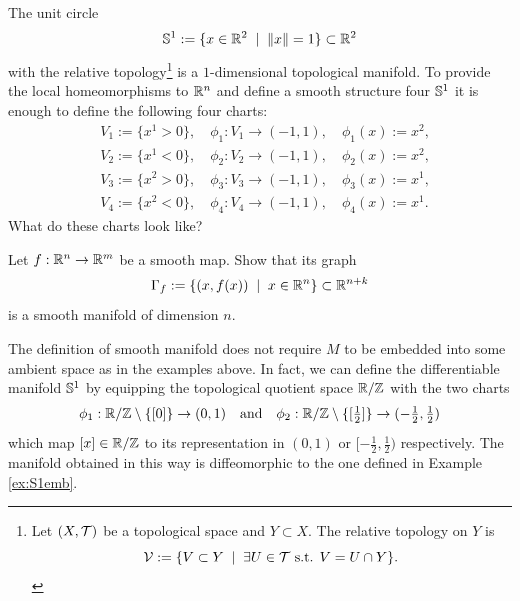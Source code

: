 \begin{example}\label{ex:S1emb}
  The unit circle
  \begin{equation}
    \mathbb{S}^1 := \{x\in\mathbb{R}^2 \;\mid\; \|x\|=1\}\subset\mathbb{R}^2
  \end{equation}
  with the relative topology\footnote{Let $(X,\mathcal{T})$ be a topological space and $Y\subset X$. The relative topology on $Y$ is \begin{equation}\mathcal{V}:=\{V\subset Y\;\mid\;\exists U\in\mathcal{T} \mbox{ s.t. } V = U \cap Y\}.\end{equation}} is a $1$-dimensional topological manifold.
  To provide the local homeomorphisms to $\mathbb{R}^n$ and define a smooth structure four $\mathbb{S}^1$ it is enough to define the following four charts:
  \begin{equation}
    \begin{aligned}
      &V_1 := \{ x^1 > 0 \},\quad \phi_1: V_1 \to (-1, 1), \quad \phi_1(x) := x^2,\\
      &V_2 := \{ x^1 < 0 \},\quad \phi_2: V_2 \to (-1, 1), \quad \phi_2(x) := x^2,\\
      &V_3 := \{ x^2 > 0 \},\quad \phi_3: V_3 \to (-1, 1), \quad \phi_3(x) := x^1,\\
      &V_4 := \{ x^2 < 0 \},\quad \phi_4: V_4 \to (-1, 1), \quad \phi_4(x) := x^1.
    \end{aligned}
  \end{equation}
  What do these charts look like?
\end{example}

\begin{exercise}
  Let $f: \mathbb{R}^n \to \mathbb{R}^m$ be a smooth map.
  Show that its graph
  \begin{equation}
    \Gamma_f := \{(x, f(x)) \;\mid\; x\in\mathbb{R}^n\} \subset\mathbb{R}^{n+k}
  \end{equation}
  is a smooth manifold of dimension $n$.
\end{exercise}

\begin{example}
  The definition of smooth manifold does not require $M$ to be embedded into some ambient space as in the examples above.
  In fact, we can define the differentiable manifold $\mathbb{S}^1$ by equipping the topological quotient space $\mathbb{R}/\mathbb{Z}$ with the two charts
  \begin{equation}\textstyle
    \phi_1 : \mathbb{R}/\mathbb{Z} \setminus\{[0]\} \to (0,1)
    \quad\mbox{and}\quad
    \phi_2 : \mathbb{R}/\mathbb{Z} \setminus\{[\frac12]\} \to (-\frac12,\frac12)
  \end{equation}
  which map $[x]\in\mathbb{R}/\mathbb{Z}$ to its representation in $(0,1)$ or $[-\frac12, \frac12)$ respectively.
  The manifold obtained in this way is diffeomorphic to the one defined in Example \ref{ex:S1emb}.
\end{example}

